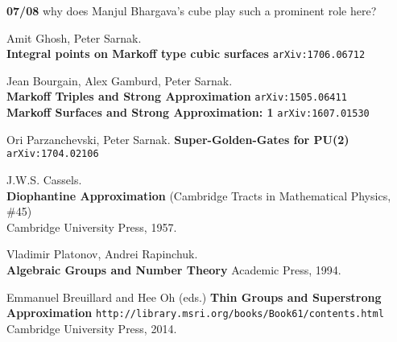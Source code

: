 \documentclass[12pt]{article}
\begin{document}
\newpage

\noindent \textbf{07/08} why does Manjul Bhargava's cube play such a prominent role here? \\ 

\vfill



\begin{thebibliography}{}

\item Amit Ghosh, Peter Sarnak. \\ 
\textbf{Integral points on Markoff type cubic surfaces} \texttt{arXiv:1706.06712}

\item Jean Bourgain, Alex Gamburd, Peter Sarnak. \\
\textbf{Markoff Triples and Strong Approximation} \hspace{30pt}\texttt{arXiv:1505.06411} \\
\textbf{Markoff Surfaces and Strong Approximation: 1} \texttt{arXiv:1607.01530}

\item Ori Parzanchevski, Peter Sarnak. \textbf{Super-Golden-Gates for PU(2)} \texttt{arXiv:1704.02106}

\item J.W.S. Cassels. \\ \textbf{Diophantine Approximation} (Cambridge Tracts in Mathematical Physics, \#45) \\ Cambridge University Press, 1957. 

\item Vladimir Platonov, Andrei Rapinchuk. \\ \textbf{Algebraic Groups and Number Theory}
Academic Press, 1994.

\item Emmanuel Breuillard and Hee Oh (eds.) \textbf{Thin Groups and Superstrong Approximation} 
\texttt{http://library.msri.org/books/Book61/contents.html} Cambridge University Press, 2014.
\end{thebibliography}
\end{document}
